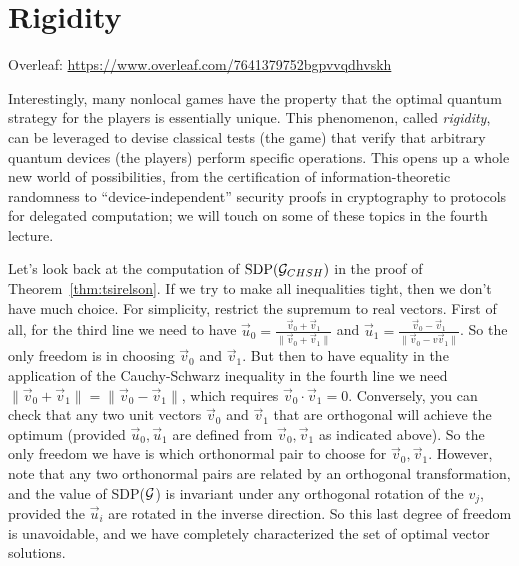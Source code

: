 \chapter{Rigidity}

Overleaf: \url{https://www.overleaf.com/7641379752bgpvvqdhvskh}

\bigskip

Interestingly, many nonlocal games have the property that the optimal quantum strategy for the players is essentially unique. This phenomenon, called \emph{rigidity}, can be leveraged to devise classical tests (the game) that verify that arbitrary quantum devices (the players) perform specific operations. This opens up a whole new world of possibilities, from the certification of information-theoretic randomness to ``device-independent'' security proofs in cryptography to protocols for delegated computation; we will touch on some of these topics in the fourth lecture. 




Let's look back at the computation of $\text{SDP}(\mathcal{G}_{CHSH})$ in the proof of Theorem~\ref{thm:tsirelson}. If we try to make all inequalities tight, then we don't have much choice. For simplicity, restrict the supremum to real vectors.  First of all, for the third line we need to have $\vec{u}_0 = \frac{\vec{v}_0+\vec{v}_1}{\|\vec{v}_0+\vec{v}_1\|}$ and $\vec{u}_1 = \frac{\vec{v}_0-\vec{v}_1}{\|\vec{v}_0-v\vec{v}_1\|}$. So the only freedom is in choosing $\vec{v}_0$ and $\vec{v}_1$. But then to have equality in the application of the Cauchy-Schwarz inequality in the fourth line we need $\|\vec{v}_0+\vec{v}_1\|=\|\vec{v}_0-\vec{v}_1\|$, which requires $\vec{v}_0 \cdot \vec{v}_1 = 0$. Conversely, you can check that any two unit vectors $\vec{v}_0$ and $\vec{v}_1$ that are orthogonal will achieve the optimum (provided $\vec{u}_0,\vec{u}_1$ are defined from $\vec{v}_0,\vec{v}_1$ as indicated above). So the only freedom we have is which orthonormal pair to choose for $\vec{v}_0,\vec{v}_1$. However, note that any two orthonormal pairs are related by an orthogonal transformation, and the value of SDP($\mathcal{G}$) is invariant under any orthogonal rotation of the $v_j$, provided the $\vec{u}_i$ are rotated in the inverse direction. So this last degree of freedom is unavoidable, and we have completely characterized the set of optimal vector solutions. 

